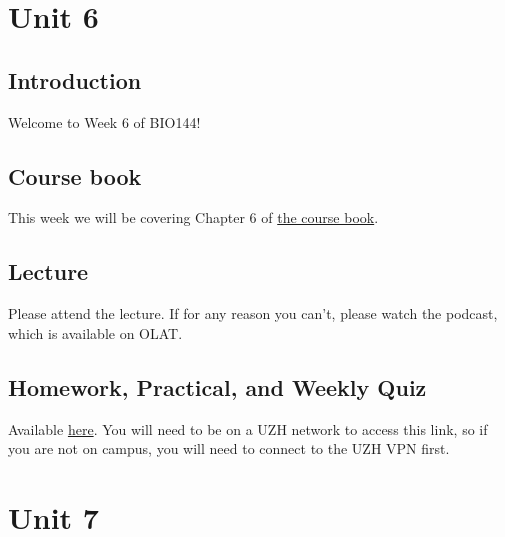 \documentclass[
  letterpaper,
  8pt,
  a4paper]{book}
\begin{document}
\chapter*{Unit 6}\label{unit-6}


\section*{Introduction}\label{introduction-6}


Welcome to Week 6 of BIO144!

\section*{Course book}\label{course-book-5}


This week we will be covering Chapter 6 of
\href{https://opetchey.github.io/BIO144_Course_Book/}{the course book}.

\section*{Lecture}\label{lecture-5}


Please attend the lecture. If for any reason you can't, please watch the
podcast, which is available on OLAT.

\section*{Homework, Practical, and Weekly
Quiz}\label{homework-practical-and-weekly-quiz-5}


Available
\href{https://rstudio.mnf.uzh.ch:3939/content/63692bfe-bf6e-442f-a216-b676b85bb663}{here}.
You will need to be on a UZH network to access this link, so if you are
not on campus, you will need to connect to the UZH VPN first.


\chapter*{Unit 7}\label{unit-7}
\end{document}
